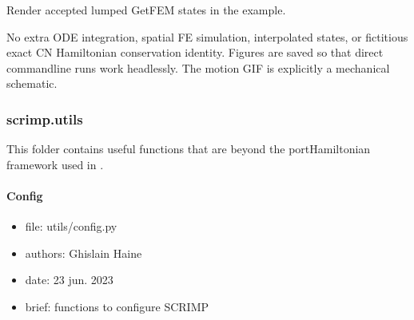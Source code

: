 \documentclass[letterpaper,10pt,english]{sphinxmanual}
\begin{document}
\begin{fulllineitems}

\pysigstartsignatures
\pysiglinewithargsret
{}
{\sphinxparamcomma {}\sphinxparamcomma {}\sphinxparamcomma {}\sphinxparamcomma {}\sphinxparamcomma {}\sphinxparamcomma {}\sphinxparamcomma {}}
{}
\pysigstopsignatures
\sphinxAtStartPar
Render  accepted lumped GetFEM states in the example.

\sphinxAtStartPar
No extra ODE integration, spatial FE simulation, interpolated
states, or fictitious exact CN Hamiltonian conservation identity.
Figures are saved so that direct command\sphinxhyphen{}line runs work headlessly.
The motion GIF is explicitly a mechanical schematic.

\end{fulllineitems}


\sphinxstepscope


\subsubsection{scrimp.utils}
\label{\detokenize{scrimp.utils:scrimp-utils}}\label{\detokenize{scrimp.utils::doc}}
\sphinxAtStartPar
This folder contains useful functions that are beyond the port\sphinxhyphen{}Hamiltonian framework used in .


\paragraph{Config}
\label{\detokenize{scrimp.utils:module-scrimp.utils.config}}\label{\detokenize{scrimp.utils:config}}\begin{itemize}
\item {} 
\sphinxAtStartPar
file:             utils/config.py

\item {} 
\sphinxAtStartPar
authors:          Ghislain Haine

\item {} 
\sphinxAtStartPar
date:             23 jun. 2023

\item {} 
\sphinxAtStartPar
brief:            functions to configure SCRIMP

\end{itemize}
\end{document}
